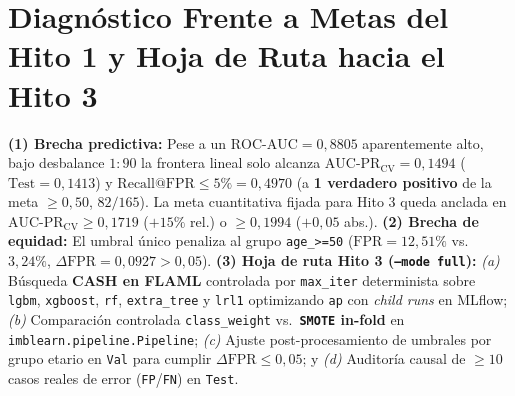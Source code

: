 \documentclass[9pt,letterpaper]{article}
\begin{document}
\section{Diagnóstico Frente a Metas del Hito 1 y Hoja de Ruta hacia el Hito 3}
\textbf{(1) Brecha predictiva:} Pese a un $\text{ROC-AUC}=0,8805$ aparentemente alto, bajo desbalance $1\!:\!90$ la frontera lineal solo alcanza $\text{AUC-PR}_{\text{CV}}=0,1494$ ($\text{Test}=0,1413$) y $\text{Recall@FPR}\le 5\% = 0,4970$ (a \textbf{1 verdadero positivo} de la meta $\ge 0,50$, $82/165$). La meta cuantitativa fijada para Hito 3 queda anclada en \textbf{$\text{AUC-PR}_{\text{CV}} \ge 0,1719$} ($+15\%$ rel.) o $\ge 0,1994$ ($+0,05$ abs.). \textbf{(2) Brecha de equidad:} El umbral único penaliza al grupo \texttt{age\_>=50} ($\text{FPR}=12,51\%$ vs.\ $3,24\%$, $\Delta\text{FPR}=0,0927 > 0,05$). \textbf{(3) Hoja de ruta Hito 3 (\texttt{--mode full}):} \textit{(a)} Búsqueda \textbf{CASH en FLAML} controlada por \texttt{max\_iter} determinista sobre \texttt{lgbm}, \texttt{xgboost}, \texttt{rf}, \texttt{extra\_tree} y \texttt{lrl1} optimizando \texttt{ap} con \textit{child runs} en MLflow; \textit{(b)} Comparación controlada \texttt{class\_weight} vs.\ \textbf{\texttt{SMOTE} in-fold} en \texttt{imblearn.pipeline.Pipeline}; \textit{(c)} Ajuste post-procesamiento de umbrales por grupo etario en \texttt{Val} para cumplir $\Delta\text{FPR}\le 0,05$; y \textit{(d)} Auditoría causal de $\ge 10$ casos reales de error (\texttt{FP}/\texttt{FN}) en \texttt{Test}.
\end{document}
